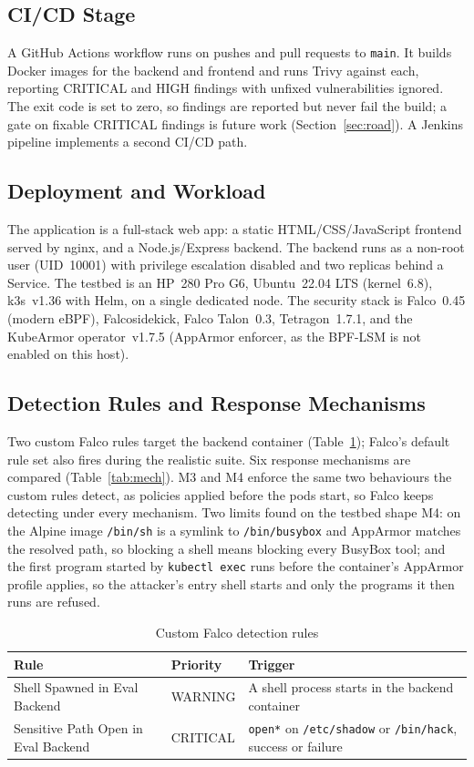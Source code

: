 \documentclass[10pt,conference]{IEEEtran}
\begin{document}
\subsection{CI/CD Stage}
A GitHub Actions workflow runs on pushes and pull requests to \texttt{main}. It builds Docker images for the backend and frontend and runs Trivy against each, reporting CRITICAL and HIGH findings with unfixed vulnerabilities ignored. The exit code is set to zero, so findings are reported but never fail the build; a gate on fixable CRITICAL findings is future work (Section~\ref{sec:road}). A Jenkins pipeline implements a second CI/CD path.

\subsection{Deployment and Workload}
The application is a full-stack web app: a static HTML/CSS/JavaScript frontend served by nginx, and a Node.js/Express backend. The backend runs as a non-root user (UID~10001) with privilege escalation disabled and two replicas behind a Service. The testbed is an HP~280 Pro G6, Ubuntu~22.04 LTS (kernel~6.8), k3s~v1.36 with Helm, on a single dedicated node. The security stack is Falco~0.45 (modern eBPF), Falcosidekick, Falco Talon~0.3, Tetragon~1.7.1, and the KubeArmor operator~v1.7.5 (AppArmor enforcer, as the BPF-LSM is not enabled on this host).

\subsection{Detection Rules and Response Mechanisms}
Two custom Falco rules target the backend container (Table~\ref{tab:rules}); Falco's default rule set also fires during the realistic suite. Six response mechanisms are compared (Table~\ref{tab:mech}). M3 and M4 enforce the same two behaviours the custom rules detect, as policies applied before the pods start, so Falco keeps detecting under every mechanism. Two limits found on the testbed shape M4: on the Alpine image \texttt{/bin/sh} is a symlink to \texttt{/bin/busybox} and AppArmor matches the resolved path, so blocking a shell means blocking every BusyBox tool; and the first program started by \texttt{kubectl exec} runs before the container's AppArmor profile applies, so the attacker's entry shell starts and only the programs it then runs are refused.

\begin{table}[t]
\caption{Custom Falco detection rules}
\label{tab:rules}
\centering
\begin{tabular}{@{}p{}p{}p{}@{}}
\toprule
Rule & Priority & Trigger\\
\midrule
Shell Spawned in Eval Backend & WARNING & A shell process starts in the backend container\\
Sensitive Path Open in Eval Backend & CRITICAL & \texttt{open*} on \texttt{/etc/shadow} or \texttt{/bin/hack}, success or failure\\
\bottomrule
\end{tabular}
\end{table}
\end{document}
